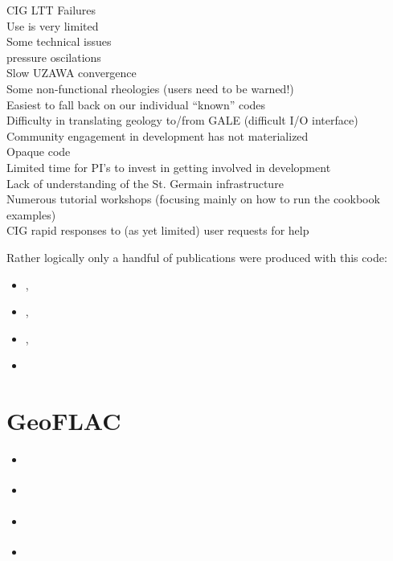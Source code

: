 \hspace{1cm}
\begin{minipage}[t]{0.75\textwidth}
CIG LTT Failures\\
Use is very limited\\
Some technical issues\\
pressure oscilations\\
Slow UZAWA convergence\\
Some non-functional rheologies (users need to be warned!)\\
Easiest to fall back on our individual ``known'' codes\\
Difficulty in translating geology to/from GALE (difficult I/O interface)\\
Community engagement in development has not materialized \\
Opaque code\\
Limited time for PI's to invest in getting involved in development\\
Lack of understanding of the St. Germain infrastructure\\
Numerous tutorial workshops (focusing mainly on how to run the cookbook examples)\\
CIG rapid responses to (as yet limited) user requests for help
\end{minipage}

Rather logically only a handful of publications were produced with this code:

\begin{small}
\begin{itemize}
\item[\twothousandeight]     \textcite{fabs08},  \textcite{gotc08}
\item[\twothousandten]       \textcite{beve10},  \textcite{crmw10}
\item[\twothousandtwelve]    \textcite{lehm12},  \textcite{liqi12}
\item[\twothousandthirteen]  \textcite{arbi13}
\end{itemize}
\end{small}

\section{GeoFLAC} 

\begin{small}
\begin{itemize}
\item[2006] \textcite{lama06}
\item[2015] \textcite{svlh15}
\item[2023] \textcite{moml23}
\item[2025] \textcite{molh25} 
\end{itemize}
\end{small}

